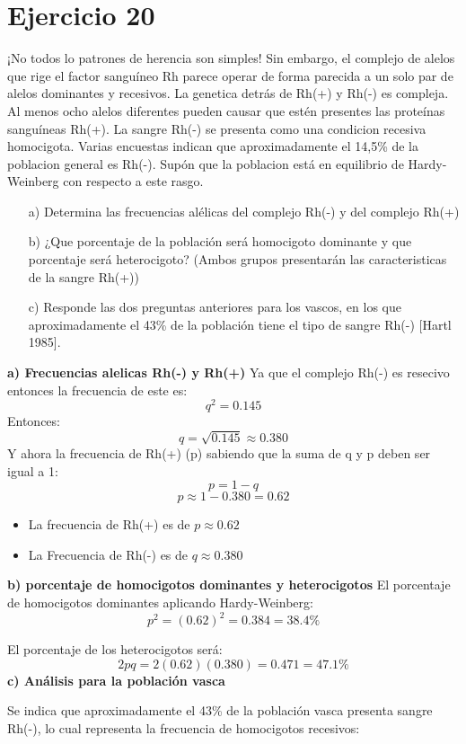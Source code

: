 \documentclass{article}
\begin{document}
\section*{Ejercicio 20}
¡No todos lo patrones de herencia son simples! Sin embargo, el complejo de alelos que rige el factor sanguíneo Rh parece operar de forma parecida a un solo par de alelos dominantes y recesivos. La genetica detrás de Rh(+) y Rh(-) es compleja. Al menos ocho alelos diferentes pueden causar que estén presentes las proteínas sanguíneas Rh(+). La sangre Rh(-) se presenta como una condicion recesiva homocigota. Varias encuestas indican que aproximadamente el 14,5\% de la poblacion general es Rh(-). Supón que la poblacion está en equilibrio de Hardy-Weinberg con respecto a este rasgo.
\begin{enumerate}
    \item[a)] Determina las frecuencias alélicas del complejo Rh(-) y del complejo Rh(+)
    \item[b)] ¿Que porcentaje de la población será homocigoto dominante y que porcentaje será heterocigoto? (Ambos grupos presentarán las caracteristicas de la sangre Rh(+))
    \item[c)] Responde las dos preguntas anteriores para los vascos, en los que aproximadamente el 43\% de la población tiene el tipo de sangre Rh(-) [Hartl 1985].
\end{enumerate}

\textbf*{a) Frecuencias alelicas Rh(-) y Rh(+)}
Ya que el complejo Rh(-) es resecivo entonces la frecuencia de este es:
\[
q^2 = 0.145
\]
Entonces:
\[
q = \sqrt{0.145} \approx 0.380
\]
Y ahora la frecuencia de Rh(+) (p) sabiendo que la suma de q y p deben ser igual a 1:
\[
p=1-q
\]
\[
p \approx 1 - 0.380 = 0.62
\]

\begin{itemize}
    \item La frecuencia de Rh(+) es de \(p \approx 0.62\)
    \item La Frecuencia de Rh(-) es de  \( q \approx 0.380\)
\end{itemize}

\textbf{b) porcentaje de homocigotos dominantes y heterocigotos}
El porcentaje de homocigotos dominantes aplicando Hardy-Weinberg:
\[
p^2 = (0.62)^2 = 0.384 = 38.4\%
\]


El porcentaje de los heterocigotos será:
\[
2pq = 2(0.62)(0.380) = 0.471 = 47.1\%
\]
\textbf{c) Análisis para la población vasca}

Se indica que aproximadamente el 43\% de la población vasca presenta sangre Rh(-), lo cual representa la frecuencia de homocigotos recesivos:
\end{document}
